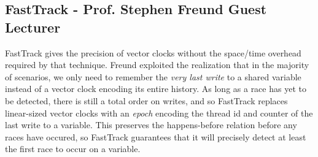 \documentclass[twoside]{article}
\begin{document}
\subsection{FastTrack - Prof. Stephen Freund Guest Lecturer}
FastTrack gives the precision of vector clocks without the space/time overhead
required by that technique. Freund exploited the realization that in the
majority of scenarios, we only need to remember the \emph{very last write} to a
shared variable instead of a vector clock encoding its entire history. As long
as a race has yet to be detected, there is still a total order on writes, and so
FastTrack replaces linear-sized vector clocks with an \emph{epoch} encoding the
thread id and counter of the last write to a variable. This preserves the
happens-before relation before any races have occured, so FastTrack guarantees
that it will precisely detect at least the first race to occur on a variable.
\end{document}
